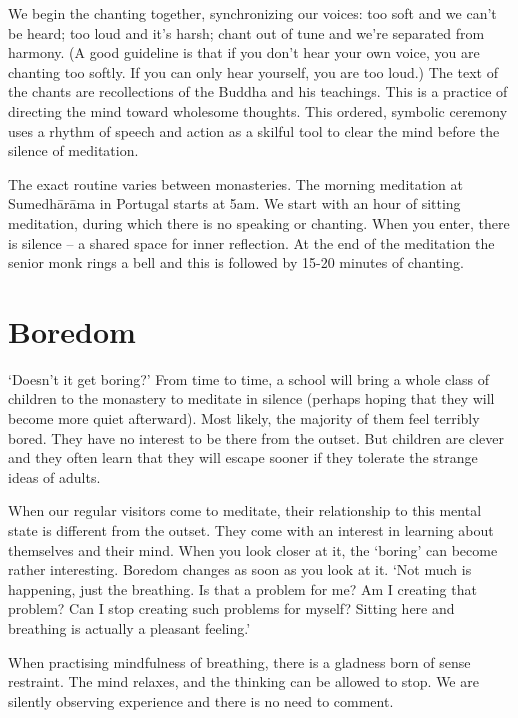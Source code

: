 We begin the chanting together, synchronizing our voices: too soft and
we can't be heard; too loud and it's harsh; chant out of tune and we're
separated from harmony. (A good guideline is that if you don't hear your
own voice, you are chanting too softly. If you can only hear yourself,
you are too loud.) The text of the chants are recollections of the
Buddha and his teachings. This is a practice of directing the mind
toward wholesome thoughts. This ordered, symbolic ceremony uses a rhythm
of speech and action as a skilful tool to clear the mind before the
silence of meditation.

The exact routine varies between monasteries. The morning meditation at
Sumedhārāma in Portugal starts at 5am. We start with an hour of sitting
meditation, during which there is no speaking or chanting. When you
enter, there is silence -- a shared space for inner reflection. At the
end of the meditation the senior monk rings a bell and this is followed
by 15-20 minutes of chanting.

\section{Boredom}


\enlargethispage*{\baselineskip}

\noindent `Doesn't it get boring?' From time to time, a school will
bring a whole class of children to the monastery to meditate in silence
(perhaps hoping that they will become more quiet afterward). Most
likely, the majority of them feel terribly bored. They have no interest
to be there from the outset. But children are clever and they often
learn that they will escape sooner if they tolerate the strange ideas of
adults.

When our regular visitors come to meditate, their relationship to this
mental state is different from the outset. They come with an interest in
learning about themselves and their mind. When you look closer at it,
the `boring' can become rather interesting. Boredom changes as soon as
you look at it. `Not much is happening, just the breathing. Is that a
problem for me? Am I creating that problem? Can I stop creating such
problems for myself? Sitting here and breathing is actually a pleasant
feeling.'

When practising mindfulness of breathing, there is a gladness born of
sense restraint. The mind relaxes, and the thinking can be allowed to
stop. We are silently observing experience and there is no need to
comment.

